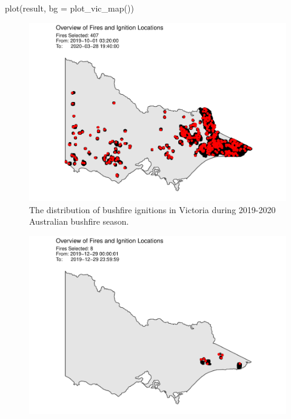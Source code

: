 \begin{Schunk}
\begin{Sinput}
plot(result, bg = plot_vic_map()) 
\end{Sinput}
\begin{figure}

{\centering \includegraphics[width=0.8\linewidth]{clustering_paper_files/figure-latex/clusteringfinalresults-1} 

}

\caption[ The distribution of bushfire ignitions in Victoria during 2019-2020 Australian bushfire season]{ The distribution of bushfire ignitions in Victoria during 2019-2020 Australian bushfire season.}\label{fig:clusteringfinalresults}
\end{figure}
\end{Schunk}

\begin{Schunk}
\begin{figure}

{\centering \includegraphics[width=0.8\linewidth]{clustering_paper_files/figure-latex/clusteringfinalresultstime-1} 

}

\end{figure}
\end{Schunk}

